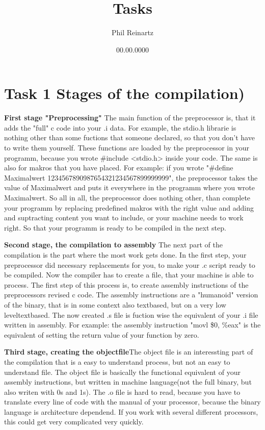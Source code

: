 \documentclass{article}
\title{Tasks}
\author{Phil Reinartz}
\date{00.00.0000}
\begin{document}
\maketitle

\section{Task 1 Stages of the compilation)}

\textbf{First stage "Preprocessing"} The main function of the preprocessor is, that it adds the "full" c code into your .i data. For example, the stdio.h librarie is nothing other than some fuctions that someone declared, so that you don't have to write them yourself. These functions are loaded by the preprocessor in your programm, because you wrote \#include <stdio.h> inside your code. The same is also for makros that you have placed. For example: if you wrote "\#define Maximalwert 1234567890987654321234567899999999", the preprocessor takes the value of Maximalwert and puts it everywhere in the programm where you wrote Maximalwert. So all in all, the preprocessor does nothing other, than complete your programm by replacing predefined makros with the right value and adding and suptracting content you want to include, or your machine needs to work right.
So that your programm is ready to be compiled in the next step.

\singlespacing

\textbf{Second stage, the compilation to assembly} The next part of the compilation is the part where the most work gets done. In the first step, your preprocessor did necessary replacements for you, to make your .c script ready to be compiled. Now the compiler has to create a file, that your machine is able to process. The first step of this process is, to create assembly instructions of the preprocessors revised c code. The assembly instructions are a "humanoid" version of the binary, that is in some context also textbased, but on a very low leveltextbased. The now created .s file is fuction wise the equivalent of your .i file written in assembly. For example: the assembly instruction  "movl    \$0, \%eax" is the equivalent of setting the return value of your function by zero.

\singlespacing

\textbf{Third stage, creating the objectfile}The object file is an interessting part of the compilation that is a easy to understand process, but not an easy to understand file. The object file is basically the functional equivalent of your assembly instructions, but written in machine language(not the full binary, but also writen with 0s and 1s). The .o file is hard to read, because you have to translate every line of code with the manual of your processor, because the binary language is architecture dependend. If you work with several different processors, this could get very complicated very quickly.
\end{document}
